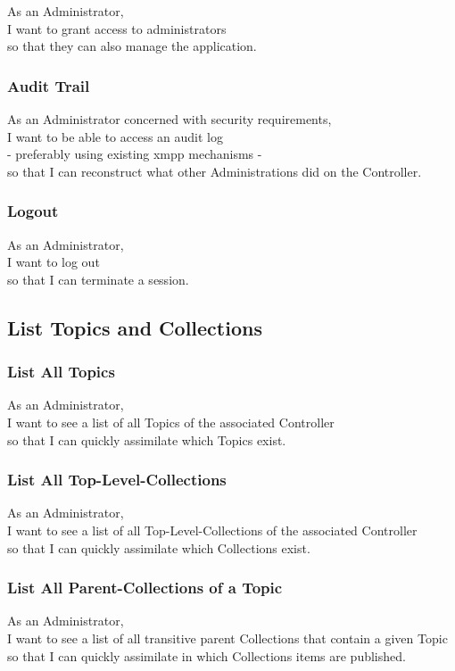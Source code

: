 As an Administrator,\\
I want to grant access to administrators \\
so that they can also manage the application.

\subsubsection{Audit Trail}\label{sec:requirement-audit-trail}

As an Administrator concerned with security requirements,\\
I want to be able to access an audit log\\
- preferably using existing \gls{xmpp} mechanisms - \\
so that I can reconstruct what other Administrations did on the Controller.

\subsubsection{Logout}\label{sec:requirement-logout}

As an Administrator,\\
I want to log out\\
so that I can terminate a session.

\subsection{List Topics and Collections}\label{sec:list-topics}

\subsubsection{List All Topics}\label{sec:requirement-list-all-topics}
As an Administrator,\\
I want to see a list of all Topics of the associated Controller\\
so that I can quickly assimilate which Topics exist.

\subsubsection{List All Top-Level-Collections}
As an Administrator,\\
I want to see a list of all Top-Level-Collections of the associated Controller\\
so that I can quickly assimilate which Collections exist.

\subsubsection{List All Parent-Collections of a Topic}
As an Administrator,\\
I want to see a list of all transitive parent Collections that contain a given Topic\\
so that I can quickly assimilate in which Collections items are published.

